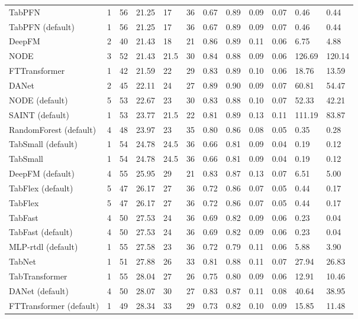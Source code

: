 \begin{tabular}{lllllrllllll}
TabPFN & 1 & 56 & 21.25 & 17 & 36 & 0.67 & 0.89 & 0.09 & 0.07 & 0.46 & 0.44 \\
TabPFN (default) & 1 & 56 & 21.25 & 17 & 36 & 0.67 & 0.89 & 0.09 & 0.07 & 0.46 & 0.44 \\
DeepFM & 2 & 40 & 21.43 & 18 & 21 & 0.86 & 0.89 & 0.11 & 0.06 & 6.75 & 4.88 \\
NODE & 3 & 52 & 21.43 & 21.5 & 30 & 0.84 & 0.88 & 0.09 & 0.06 & 126.69 & 120.14 \\
FTTransformer & 1 & 42 & 21.59 & 22 & 29 & 0.83 & 0.89 & 0.10 & 0.06 & 18.76 & 13.59 \\
DANet & 2 & 45 & 22.11 & 24 & 27 & 0.89 & 0.90 & 0.09 & 0.07 & 60.81 & 54.47 \\
NODE (default) & 5 & 53 & 22.67 & 23 & 30 & 0.83 & 0.88 & 0.10 & 0.07 & 52.33 & 42.21 \\
SAINT (default) & 1 & 53 & 23.77 & 21.5 & 22 & 0.81 & 0.89 & 0.13 & 0.11 & 111.19 & 83.87 \\
RandomForest (default) & 4 & 48 & 23.97 & 23 & 35 & 0.80 & 0.86 & 0.08 & 0.05 & 0.35 & 0.28 \\
TabSmall (default) & 1 & 54 & 24.78 & 24.5 & 36 & 0.66 & 0.81 & 0.09 & 0.04 & 0.19 & 0.12 \\
TabSmall & 1 & 54 & 24.78 & 24.5 & 36 & 0.66 & 0.81 & 0.09 & 0.04 & 0.19 & 0.12 \\
DeepFM (default) & 4 & 55 & 25.95 & 29 & 21 & 0.83 & 0.87 & 0.13 & 0.07 & 6.51 & 5.00 \\
TabFlex (default) & 5 & 47 & 26.17 & 27 & 36 & 0.72 & 0.86 & 0.07 & 0.05 & 0.44 & 0.17 \\
TabFlex & 5 & 47 & 26.17 & 27 & 36 & 0.72 & 0.86 & 0.07 & 0.05 & 0.44 & 0.17 \\
TabFast & 4 & 50 & 27.53 & 24 & 36 & 0.69 & 0.82 & 0.09 & 0.06 & 0.23 & 0.04 \\
TabFast (default) & 4 & 50 & 27.53 & 24 & 36 & 0.69 & 0.82 & 0.09 & 0.06 & 0.23 & 0.04 \\
MLP-rtdl (default) & 1 & 55 & 27.58 & 23 & 36 & 0.72 & 0.79 & 0.11 & 0.06 & 5.88 & 3.90 \\
TabNet & 1 & 51 & 27.88 & 26 & 33 & 0.81 & 0.88 & 0.11 & 0.07 & 27.94 & 26.83 \\
TabTransformer & 1 & 55 & 28.04 & 27 & 26 & 0.75 & 0.80 & 0.09 & 0.06 & 12.91 & 10.46 \\
DANet (default) & 4 & 50 & 28.07 & 30 & 27 & 0.83 & 0.87 & 0.11 & 0.08 & 40.64 & 38.95 \\
FTTransformer (default) & 1 & 49 & 28.34 & 33 & 29 & 0.73 & 0.82 & 0.10 & 0.09 & 15.85 & 11.48 \\

\end{tabular}
